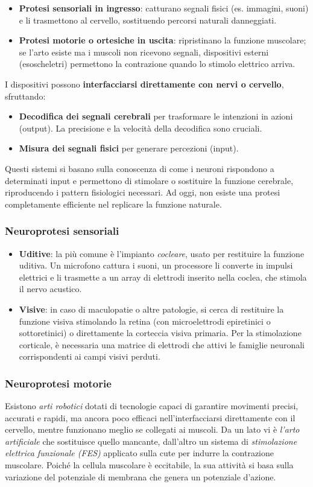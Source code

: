 \begin{itemize}
  \item \textbf{Protesi sensoriali in ingresso}: catturano segnali fisici (es. immagini, suoni) e li trasmettono al cervello, sostituendo percorsi naturali danneggiati.
  \item \textbf{Protesi motorie o ortesiche in uscita}: ripristinano la funzione muscolare; se l’arto esiste ma i muscoli non ricevono segnali, dispositivi esterni (esoscheletri) permettono la contrazione quando lo stimolo elettrico arriva.
\end{itemize}
I dispositivi possono \textbf{interfacciarsi direttamente con nervi o cervello}, sfruttando:
\begin{itemize}
  \item \textbf{Decodifica dei segnali cerebrali} per trasformare le intenzioni in azioni (output). La precisione e la velocità della decodifica sono cruciali.
  \item \textbf{Misura dei segnali fisici} per generare percezioni (input).
\end{itemize}
Questi sistemi si basano sulla conoscenza di come i neuroni rispondono a determinati input e permettono di stimolare o sostituire la funzione cerebrale, riproducendo i pattern fisiologici necessari. Ad oggi, non esiste una protesi completamente efficiente nel replicare la funzione naturale.

\subsubsection{Neuroprotesi sensoriali}
\begin{itemize}
  \item \textbf{Uditive}: la più comune è l’impianto \textit{cocleare}, usato per restituire la funzione uditiva. Un microfono cattura i suoni, un processore li converte in impulsi elettrici e li trasmette a un array di elettrodi inserito nella coclea, che stimola il nervo acustico.
  \item \textbf{Visive}: in caso di maculopatie o altre patologie, si cerca di restituire la funzione visiva stimolando la retina (con microelettrodi epiretinici o sottoretinici) o direttamente la corteccia visiva primaria. Per la stimolazione corticale, è necessaria una matrice di elettrodi che attivi le famiglie neuronali corrispondenti ai campi visivi perduti.
\end{itemize}

\subsubsection{Neuroprotesi motorie}
Esistono \textit{arti robotici} dotati di tecnologie capaci di garantire movimenti precisi, accurati e rapidi, ma ancora poco efficaci nell’interfacciarsi direttamente con il cervello, mentre funzionano meglio se collegati ai muscoli. Da un lato vi è \textit{l’arto artificiale} che sostituisce quello mancante, dall’altro un sistema di \textit{stimolazione elettrica funzionale (FES)} applicato sulla cute per indurre la contrazione muscolare. Poiché la cellula muscolare è eccitabile, la sua attività si basa sulla variazione del potenziale di membrana che genera un potenziale d’azione.

